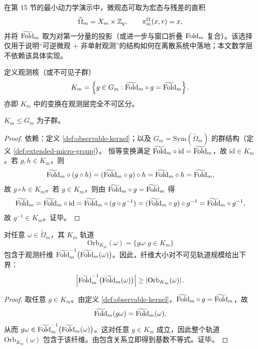 \begin{remark}[一个与实验一致的具体选择]
在第 15 节的最小动力学演示中，微观态可取为宏态与残差的直积
$$
\widetilde{\Omega}_m=X_m\times \mathbb{Z}_q,
\qquad
\pi_m^{\Omega}(x,r)=x,
$$
并将 $\widetilde{\mathrm{Fold}}_m$ 取为对第一分量的投影（或进一步与窗口折叠 $\mathrm{Fold}_m$ 复合）。该选择仅用于说明“可逆微观 + 非单射观测”的结构如何在离散系统中落地；本文数学层不依赖该具体实现。
\end{remark}

\begin{definition}\label{def:observable-kernel}
定义观测核（或不可见子群）
$$
K_m=\left\{g\in G_m:\widetilde{\mathrm{Fold}}_m\circ g=\widetilde{\mathrm{Fold}}_m\right\}.
$$
亦即 $K_m$ 中的变换在观测层完全不可区分。
\end{definition}

\begin{proposition}\label{prop:Km-subgroup}
$K_m\le G_m$ 为子群。
\end{proposition}

\begin{proof}
\MathTag 依赖：定义 \ref{def:observable-kernel}；以及 $G_m=\mathrm{Sym}(\widetilde{\Omega}_m)$ 的群结构（定义 \ref{def:extended-micro-group}）。
恒等变换满足 $\widetilde{\mathrm{Fold}}_m\circ \mathrm{id}=\widetilde{\mathrm{Fold}}_m$，故 $\mathrm{id}\in K_m$。若 $g,h\in K_m$，则
$$
\widetilde{\mathrm{Fold}}_m\circ (g\circ h)=(\widetilde{\mathrm{Fold}}_m\circ g)\circ h=\widetilde{\mathrm{Fold}}_m\circ h=\widetilde{\mathrm{Fold}}_m,
$$
故 $g\circ h\in K_m$。若 $g\in K_m$，则由 $\widetilde{\mathrm{Fold}}_m\circ g=\widetilde{\mathrm{Fold}}_m$ 得
$$
\widetilde{\mathrm{Fold}}_m=\widetilde{\mathrm{Fold}}_m\circ \mathrm{id}=\widetilde{\mathrm{Fold}}_m\circ (g\circ g^{-1})=(\widetilde{\mathrm{Fold}}_m\circ g)\circ g^{-1}=\widetilde{\mathrm{Fold}}_m\circ g^{-1},
$$
故 $g^{-1}\in K_m$。证毕。
\end{proof}

\begin{proposition}[不可见对称轨道落在纤维内]\label{prop:kernel-orbits-in-fiber}
对任意 $\omega\in\widetilde{\Omega}_m$，其 $K_m$ 轨道
$$
\mathrm{Orb}_{K_m}(\omega)=\{g\omega:g\in K_m\}
$$
包含于观测纤维 $\widetilde{\mathrm{Fold}}_m^{-1}\bigl(\widetilde{\mathrm{Fold}}_m(\omega)\bigr)$。因此，纤维大小对不可见轨道规模给出下界：
$$
\left\lvert \widetilde{\mathrm{Fold}}_m^{-1}\bigl(\widetilde{\mathrm{Fold}}_m(\omega)\bigr)\right\rvert\ge \left\lvert \mathrm{Orb}_{K_m}(\omega)\right\rvert.
$$
\end{proposition}

\begin{proof}
取任意 $g\in K_m$。由定义 \ref{def:observable-kernel}，$\widetilde{\mathrm{Fold}}_m\circ g=\widetilde{\mathrm{Fold}}_m$，故
$$
\widetilde{\mathrm{Fold}}_m(g\omega)=\widetilde{\mathrm{Fold}}_m(\omega),
$$
从而 $g\omega\in \widetilde{\mathrm{Fold}}_m^{-1}\bigl(\widetilde{\mathrm{Fold}}_m(\omega)\bigr)$。这对任意 $g\in K_m$ 成立，因此整个轨道 $\mathrm{Orb}_{K_m}(\omega)$ 包含于该纤维。由包含关系立即得到基数不等式。证毕。
\end{proof}

